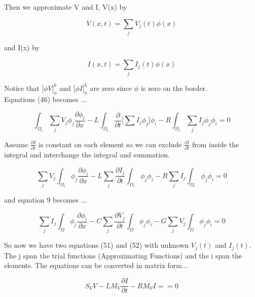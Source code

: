 \documentclass[12pt, letterpaper]{article}
\begin{document}
Then we approximate V and I, V(x) by

\begin{equation}V(x, t) = \sum_j V_j(t) \phi(x) \end{equation}

and I(x) by 

\begin{equation}I(x, t) = \sum_j I_j(t) \phi(x) \end{equation}

Notice that $\Big[\phi V \Big]_a^b$ and $\Big[\phi I \Big]_a^b$ are zero since $\phi$ is zero on the border.\\

Equations (46) becomes ...

\begin{equation}
	\int_{\Omega_i} \sum_j V_j \phi_j \frac{\partial{\phi_i}}{\partial{x}} 
	- L \int_{\Omega_i} \frac{\partial{}}{\partial t} \Big[ \sum{I_j} \phi_j \Big] \phi_i
	-  R \int_{\Omega_i} \sum_j I_j \phi_j \phi_i
	= 0
\end{equation}

Assume $\frac{\partial{I}}{\partial{t}}$ is constant on each element so we can exclude $\frac{\partial{I}}{\partial{t}}$ from inside the integral and interchange the integral and summation.

\begin{equation}
	\sum_j V_j \int_{\Omega_i}\phi_j \frac{\partial{\phi_i}}{\partial{x}} 
	- L \sum_j \frac{\partial{I_j}}{\partial t} \int_{\Omega_i} \phi_j \phi_i
	-  R \sum_j I_j \int_{\Omega_i} \phi_j \phi_i
	= 0
\end{equation}

and equation 9 becomes ...

\begin{equation}
	\sum_j I_j  \int_\Omega \phi_j \frac{\partial{\phi_i}}{\partial{x}}
	- C \sum_j \frac{\partial{V_j}}{\partial{t}} \int_\Omega \phi_j \phi_i
	- G \sum_j V_j \int_\Omega \phi_j \phi_i
	= 0
\end{equation}

So now we have two equations (51) and (52) with unknown $V_j(t)$ and $I_j(t)$.\\

The j span the trial functions (Approximating Functions) and the i span the elements. The equations can be converted in matrix form...

\begin{equation}
	S_V V - L M_V \frac{\partial I}{\partial t} - R M_V I = 
	= 0
\end{equation}
\end{document}

